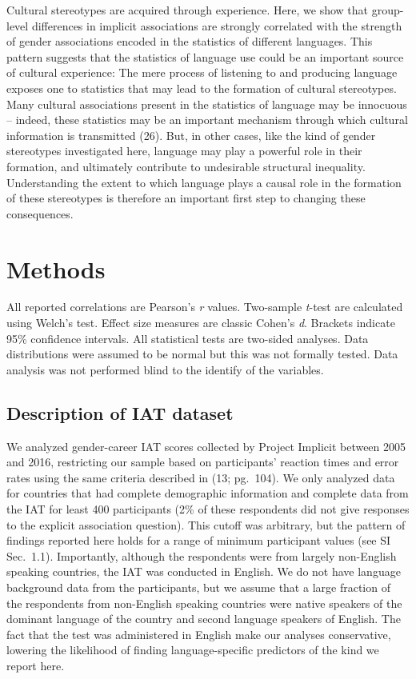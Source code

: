 \documentclass[9pt,twocolumn]{pnas-new}
\begin{document}
Cultural stereotypes are acquired through experience. Here, we show that
group-level differences in implicit associations are strongly correlated with the strength of gender associations encoded in the statistics of different languages. This pattern suggests that the statistics of language use could be an important source of cultural experience: The mere process of
listening to and producing language exposes one to statistics that may
lead to the formation of cultural stereotypes. Many cultural
associations present in the statistics of language may be innocuous --
indeed, these statistics may be an important mechanism through which
cultural information is transmitted (26). But, in
other cases, like the kind of gender stereotypes investigated here,
language may play a powerful role in their formation, and ultimately
contribute to undesirable structural inequality. Understanding the extent to which language plays a causal role in the formation of these stereotypes is therefore an important first step to changing these consequences.

\section*{Methods}

All reported correlations are Pearson's \emph{r} values.  Two-sample \emph{t}-test are calculated using Welch's test. Effect size measures are classic Cohen's \emph{d}.  Brackets indicate 95\% confidence intervals. All statistical tests are two-sided analyses. Data distributions were assumed to be normal but this was not formally tested. Data analysis was not performed blind to the identify of the variables.
 
\subsection*{Description of IAT dataset}

We analyzed gender-career IAT scores collected by Project Implicit
between 2005 and 2016, restricting our sample based on participants'
reaction times and error rates using the same criteria described in (13; pg.~104). We only analyzed data for
countries that had complete demographic information and complete data
from the IAT for least 400 participants (2\% of these respondents did
not give responses to the explicit association question). This cutoff was
arbitrary, but the pattern of findings reported here holds for a range
of minimum participant values (see
SI Sec.\ 1.1).  Importantly, although the
respondents were from largely non-English speaking countries, the IAT
was conducted in English. We do not have language background data from
the participants, but we assume that a large fraction of the respondents
from non-English speaking countries were native speakers of the dominant
language of the country and second language speakers of English. The fact that the test was administered in English make our analyses conservative, lowering the likelihood of finding language-specific predictors of the kind we report here.
\end{document}
